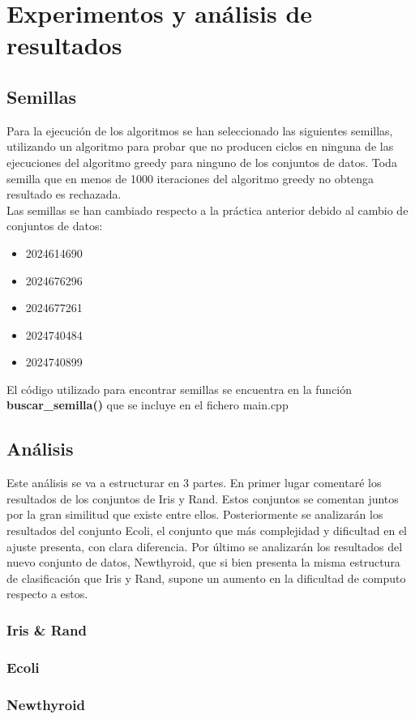 \chapter{Experimentos y análisis de resultados}
\section{Semillas}
Para la ejecución de los algoritmos se han seleccionado las siguientes semillas, utilizando un algoritmo para probar que no producen ciclos en ninguna de las ejecuciones del algoritmo greedy para ninguno de los conjuntos de datos. Toda semilla que en menos de 1000 iteraciones del algoritmo greedy no obtenga resultado es rechazada. \\
Las semillas se han cambiado respecto a la práctica anterior debido al cambio de conjuntos de datos:
\begin{itemize}
   \item 2024614690
   \item 2024676296
   \item 2024677261
   \item 2024740484
   \item 2024740899
\end{itemize}


El código utilizado para encontrar semillas se encuentra en la función \textbf{buscar\_semilla()} que se incluye en el fichero main.cpp


\section{Análisis}
Este análisis se va a estructurar en 3 partes. En primer lugar comentaré los resultados de los conjuntos de Iris y Rand. Estos conjuntos se comentan juntos por la gran similitud que existe entre ellos. Posteriormente se analizarán los resultados del conjunto Ecoli, el conjunto que más complejidad y dificultad en el ajuste presenta, con clara diferencia. Por último se analizarán los resultados del nuevo conjunto de datos, Newthyroid, que si bien presenta la misma estructura de clasificación que Iris y Rand, supone un aumento en la dificultad de computo respecto a estos.

\subsection{Iris \& Rand}

\subsection{Ecoli}

\subsection{Newthyroid}
